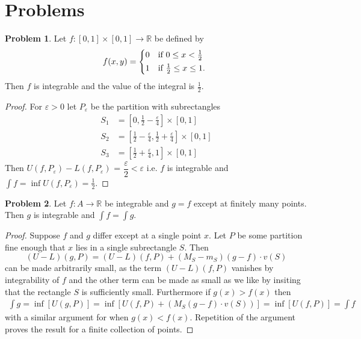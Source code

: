 \documentclass[20pt]{article}
\theoremstyle{plain}
\theoremstyle{definition}
\newtheorem*{problem}{Problem}
\newcommand{\reals}{\mathbb{R}}
\begin{document}
\section{Problems}

\begin{problem}{3.1}
  Let $f: [0,1] \times [0, 1] \to \reals$ be defined by
 \begin{equation*}
    f(x, y) =
    \begin{cases*}
      0 & if $0 \leq x < \frac{1}{2}$ \\
      1 & if $ \frac{1}{2} \leq x \leq 1 $.
    \end{cases*}
  \end{equation*}
Then $f$ is integrable and the value of the integral is $\frac{1}{2}.$
\end{problem}

\begin{proof}
  For $\varepsilon > 0$ let $P_\varepsilon$ be the partition with subrectangles 
  \begin{align*}
    S_1 &= [0, \frac{1}{2} - \frac{\varepsilon}{4}] \times [0, 1] \\
    S_2 &= [\frac{1}{2} -\frac{\varepsilon}{4}, \frac{1}{2} + \frac{\varepsilon}{4}] \times [0, 1] \\
    S_3 &= [\frac{1}{2} + \frac{\varepsilon}{4}, 1] \times [0, 1]
   \end{align*}
   Then 
   $U(f, P_\varepsilon) - L(f, P_\varepsilon)$ = $\dfrac{\varepsilon}{2} < \varepsilon$ 
   i.e. $f$ is integrable
   and $\int f = \inf U(f, P_\varepsilon) = \frac{1}{2}.$
\end{proof}


\begin{problem}{3.2}
  Let $f: A \to \reals$ be integrable and $g = f$ except at finitely many points.
  Then $g$ is integrable and $\int f = \int g.$
\end{problem}

\begin{proof}
  Suppose $f$ and $g$ differ except at a single point $x$.
  Let $P$ be some partition fine enough that $x$ lies in a single 
  subrectangle $S$. Then
  $$(U-L)(g, P) = (U-L)(f, P) + (M_S-m_S)(g-f)\cdot v(S)$$
  can be made arbitrarily small, as the term $(U-L)(f, P)$ vanishes by 
  integrability of $f$ and the other term can be made as small
  as we like by insiting that the rectangle $S$ is sufficiently small. 
  Furthermore if $g(x) > f(x)$ then 
  \begin{align*}
    \int g = \inf [U(g, P)] = \inf[ U(f, P) + (M_S(g - f)\cdot v(S))] = \inf[U(f, P)] = \int f
  \end{align*}
  with a similar argument for when $g(x) < f(x).$  
  Repetition of the argument proves the result for a finite collection of 
  points.
\end{proof}
\end{document}
